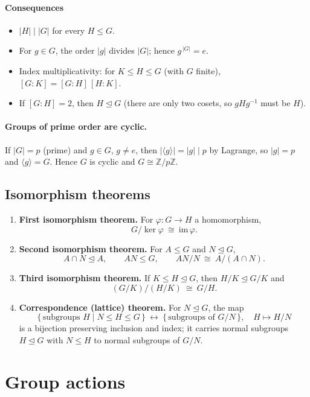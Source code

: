 \documentclass[12pt]{article}
\begin{document}
\paragraph{Consequences}
\begin{itemize}[leftmargin=1.2em]
  \item $|H|\mid |G|$ for every $H\le G$.
  \item For $g\in G$, the order $|g|$ divides $|G|$; hence $g^{\,|G|}=e$.
  \item Index multiplicativity: for $K\le H\le G$ (with $G$ finite),
        \([G\!:\!K]=[G\!:\!H]\,[H\!:\!K]\).
  \item If $[G\!:\!H]=2$, then $H\trianglelefteq G$ (there are only two cosets, so $gHg^{-1}$ must be $H$).
\end{itemize}

\paragraph{Groups of prime order are cyclic.}
If $|G|=p$ (prime) and $g\in G$, $g\neq e$, then $|\langle g\rangle|=|g|\mid p$ by Lagrange,
so $|g|=p$ and $\langle g\rangle=G$. Hence $G$ is cyclic and $G\cong \mathbb{Z}/p\mathbb{Z}$.

\subsection{Isomorphism theorems}
\begin{enumerate}[label=(\arabic*)]
\item \textbf{First isomorphism theorem.} For $\varphi:G\to H$ a homomorphism,
\[
G/\ker\varphi \ \cong\ \mathrm{im}\,\varphi.
\]
\item \textbf{Second isomorphism theorem.} For $A\le G$ and $N\trianglelefteq G$,
\[
A\cap N\trianglelefteq A,\qquad AN\le G,\qquad AN/N\ \cong\ A/(A\cap N).
\]
\item \textbf{Third isomorphism theorem.} If $K\le H\trianglelefteq G$, then $H/K\trianglelefteq G/K$ and
\[
(G/K)/(H/K)\ \cong\ G/H.
\]
\item \textbf{Correspondence (lattice) theorem.} For $N\trianglelefteq G$, the map
\[
\{\,\text{subgroups }H\mid N\le H\le G\,\}\ \longleftrightarrow\ \{\,\text{subgroups of }G/N\,\},\quad
H\mapsto H/N
\]
is a bijection preserving inclusion and index; it carries normal subgroups $H\trianglelefteq G$ with $N\le H$ to normal subgroups of $G/N$.
\end{enumerate}

\section{Group actions}
\end{document}
